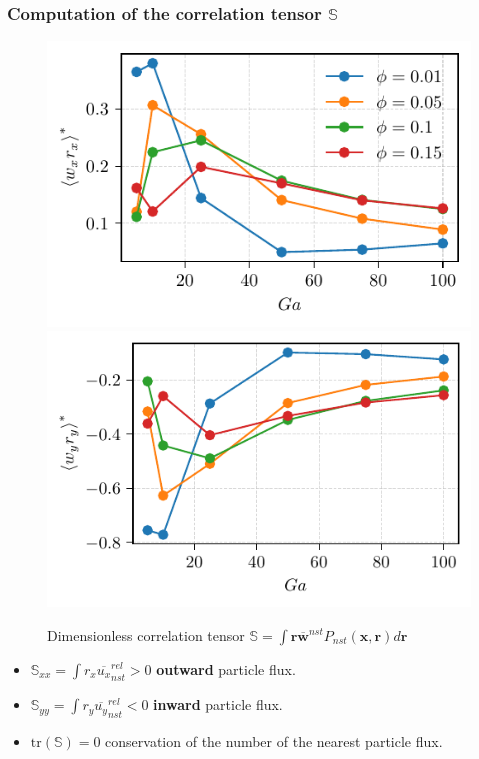\documentclass{sintefbeamer}
\newcommand{\nstavg}[1]{\overline{#1}^{nst}}
\newcommand{\nstrelavg}[1]{\overline{#1}_{nst}^{rel}}
\begin{document}
\begin{frame}
  \frametitle{Computation of the correlation tensor $\mathbb{S}$ }
  \begin{figure}
    \begin{centering}
      \includegraphics[height=0.25\textwidth]{image/HOMOGENEOUS/fPA/URxx.pdf}
      \includegraphics[height=0.25\textwidth]{image/HOMOGENEOUS/fPA/URyy.pdf}
      \caption{Dimensionless correlation tensor $\mathbb{S} =  \int \textbf{r}\nstavg{\textbf{w}} P_{nst}(\textbf{x},\textbf{r})d\textbf{r}$}
    \end{centering}
  \end{figure}

  \begin{itemize}
    \item $\mathbb{S}_{xx} = \int r_x\nstrelavg{u_x} > 0$ \textbf{outward} particle flux.  
    \item $\mathbb{S}_{yy} = \int r_y\nstrelavg{u_y} < 0$ \textbf{inward} particle flux. 
    \item $\text{tr}\left(\mathbb{S}\right) = 0$ conservation of the number of the nearest particle flux. 
  \end{itemize} 
\end{frame}
\end{document}
